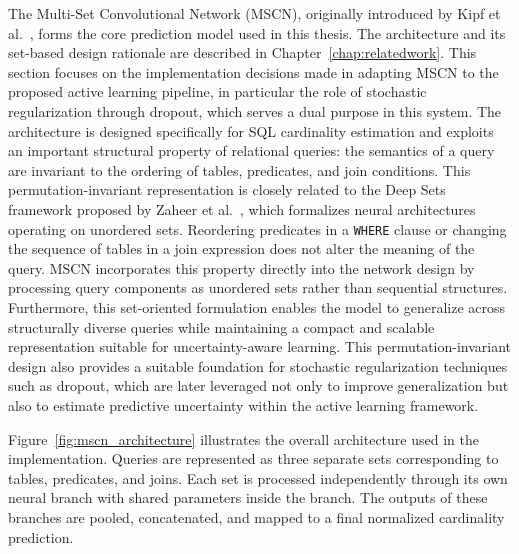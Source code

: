 The Multi-Set Convolutional Network (MSCN), originally introduced by Kipf et al.~\cite{DBLP:conf/cidr/KipfKRLBK19}, forms the core prediction model used in this thesis. The architecture and its set-based design rationale are described in Chapter~\ref{chap:relatedwork}. This section focuses on the implementation decisions made in adapting MSCN to the proposed active learning pipeline, in particular the role of stochastic regularization through dropout, which serves a dual purpose in this system. The architecture is designed specifically for SQL cardinality estimation and exploits an important structural property of relational queries: the semantics of a query are invariant to the ordering of tables, predicates, and join conditions. This permutation-invariant representation is closely related to the Deep Sets framework proposed by Zaheer et al.~\cite{10.5555/3294996.3295098}, which formalizes neural architectures operating on unordered sets. Reordering predicates in a \texttt{WHERE} clause or changing the sequence of tables in a join expression does not alter the meaning of the query. MSCN incorporates this property directly into the network design by processing query components as unordered sets rather than sequential structures. Furthermore, this set-oriented formulation enables the model to generalize across structurally diverse queries while maintaining a compact and scalable representation suitable for uncertainty-aware learning. This permutation-invariant design also provides a suitable foundation for stochastic regularization techniques such as dropout, which are later leveraged not only to improve generalization but also to estimate predictive uncertainty within the active learning framework.

Figure~\ref{fig:mscn_architecture} illustrates the overall architecture used in the implementation. Queries are represented as three separate sets corresponding to tables, predicates, and joins. Each set is processed independently through its own neural branch with shared parameters inside the branch. The outputs of these branches are pooled, concatenated, and mapped to a final normalized cardinality prediction.


